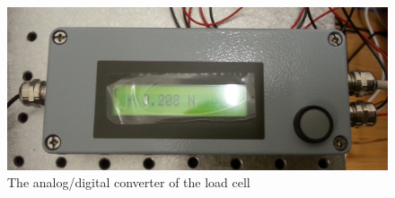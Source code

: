 \begin{figure}[!ht]
	\centering
		\includegraphics[width=1.0\textwidth]{images/AnalogDigitalConverter}
	\caption{The analog/digital converter of the load cell}
	\label{fig:analogdigitalconverter}
\end{figure}
